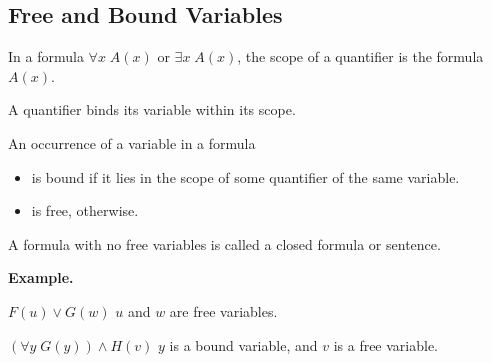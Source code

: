 \documentclass[11pt]{article}
\theoremstyle{definition}
\begin{document}
\subsection{Free and Bound Variables}
In a formula $\forall x \; A(x)$ or $\exists x \; A(x)$, the scope of a quantifier is the formula $A(x)$. 

A quantifier binds its variable within its scope.

An occurrence of a variable in a formula\vspace{-0.25cm}
\begin{itemize}
    \item is bound if it lies in the scope of some quantifier of the same variable.
    \item is free, otherwise.
\end{itemize}
\vspace{-0.25cm}
A formula with no free variables is called a closed formula or sentence.

{\bf Example.} 

$F(u) \vee G(w)$ \quad\quad\quad $u$ and $w$ are free variables.

$(\forall y \; G(y)) \wedge H(v)$ \quad $y$ is a bound variable, and $v$ is a free variable.
\end{document}
